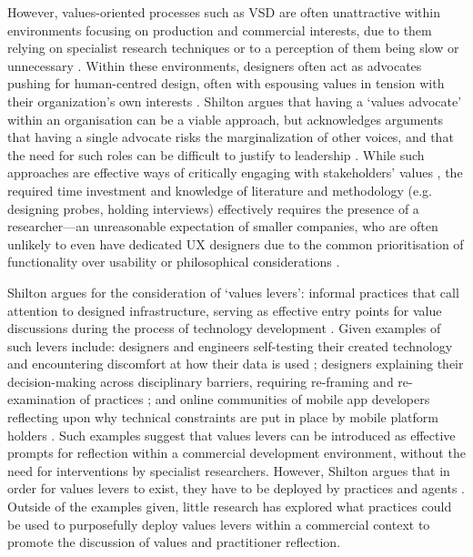 However, values-oriented processes such as VSD are often unattractive within environments focusing on production and commercial interests, due to them relying on specialist research techniques or to a perception of them being slow or unnecessary \cite{Shilton2013}. Within these environments, designers often act as advocates pushing for human-centred design, often with espousing values in tension with their organization's own interests \cite{Chivukula2020}. Shilton argues that having a `values advocate' within an organisation can be a viable approach, but acknowledges arguments that having a single advocate risks the marginalization of other voices, and that the need for such roles can be difficult to justify to leadership \cite{shilton2018, manders2013, Borning2012}. While such approaches are effective ways of critically engaging with stakeholders' values \cite{DeVito2021}, the required time investment and knowledge of literature and methodology (e.g. designing probes, holding interviews) effectively requires the presence of a researcher---an unreasonable expectation of smaller companies, who are often unlikely to even have dedicated UX designers due to the common prioritisation of functionality over usability or philosophical considerations \cite{Ardito2014, Shilton2013}.

Shilton argues for the consideration of `values levers': informal practices that call attention to designed infrastructure, serving as effective entry points for value discussions during the process of technology development \cite{Shilton2013, shilton2018}. Given examples of such levers include: designers and engineers self-testing their created technology and encountering discomfort at how their data is used \cite{Shilton2013}; designers explaining their decision-making across disciplinary barriers, requiring re-framing and re-examination of practices \cite{shilton2018}; and online communities of mobile app developers reflecting upon why technical constraints are put in place by mobile platform holders \cite{shilton2019}. Such examples suggest that values levers can be introduced as effective prompts for reflection within a commercial development environment, without the need for interventions by specialist researchers. However, Shilton argues that in order for values levers to exist, they have to be deployed by practices and agents \cite{Shilton2013}. Outside of the examples given, little research has explored what practices could be used to purposefully deploy values levers within a commercial context to promote the discussion of values and practitioner reflection.

